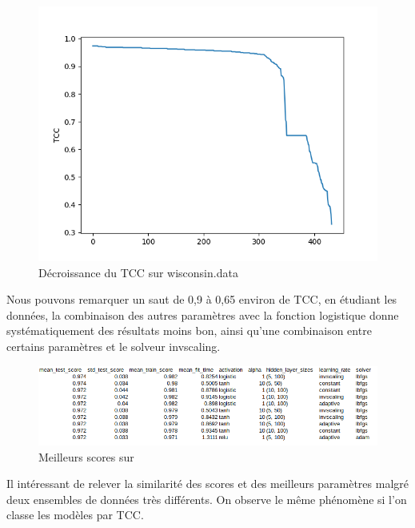 \documentclass[10pt,letterpaper]{article}
\begin{document}
\begin{figure}[H]
\centering
\includegraphics[scale=0.65]{images/wisc_pmc_2.png}
\caption{Décroissance du TCC sur wisconsin.data}
\end{figure}

Nous pouvons remarquer un saut de 0,9 à 0,65 environ de TCC, en étudiant les données, la combinaison des autres paramètres avec la fonction logistique donne systématiquement des résultats moins bon, ainsi qu’une combinaison entre certains paramètres et le solveur invscaling.


\begin{figure}[H]
\centering
\includegraphics[scale=0.65]{images/dj_pmc_1.png}
\caption{Meilleurs scores sur \protect{}}
\end{figure}

Il intéressant de relever la similarité des scores et des meilleurs paramètres malgré deux ensembles de données très différents.
On observe le même phénomène si l’on classe les modèles par TCC.
\end{document}
